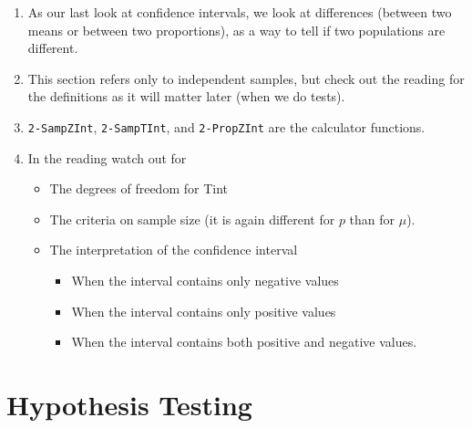 \documentclass{article}
\begin{document}
\begin{enumerate}

    \item As our last look at confidence intervals, we look at differences (between two means or between two proportions), as a way to tell if two populations are different.
    
    \item This section refers only to independent samples, but check out the reading for the definitions as it will matter later (when we do tests).
    
    \item \texttt{2-SampZInt}, \texttt{2-SampTInt}, and \texttt{2-PropZInt} are the calculator functions.
    
    \item In the reading watch out for
    
        \begin{itemize}
        
            \item The degrees of freedom for Tint
            
            \item The criteria on sample size (it is again different for $p$ than for $\mu$).
            
            \item The interpretation of the confidence interval
                
            \begin{itemize}
                
                \item When the interval contains only negative values
                
                \item When the interval contains only positive values
                
                \item When the interval contains both positive and negative values.
                
            \end{itemize}
            
        \end{itemize}
        
\end{enumerate}


\section*{Hypothesis Testing}
\end{document}
